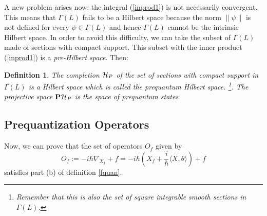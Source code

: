 \documentclass[12pt]{article}
\newtheorem{definition}{Definition}
\def\H{{\cal H}}
\begin{document}
A new problem arises now: the integral (\ref{inprod1})
is not necessarily convergent. This means that
$\Gamma (L)$ fails to be a Hilbert space
because the norm $\| \psi \|$ is not defined for every
$\psi \in \Gamma (L)$ and hence
$\Gamma (L)$ cannot be the intrinsic Hilbert space.
In order to avoid this difficulty, we can take the subset of
$\Gamma (L)$ made of sections with compact support.
This subset with the inner product
(\ref{inprod1}) is a {\it pre-Hilbert space}. Then:

\begin{definition}
The completion
$\H_P$ of the set of sections with compact support in
$\Gamma (L)$ is a Hilbert space which is called the
{\rm prequantum Hilbert space}.%
\footnote{
Remember that this is also the set of
square integrable smooth sections in $\Gamma (L)$.}.
The projective space ${\bf P}\H_P$
is the {\rm space of prequantum states}
\label{prehs}
\end{definition}



\subsection{Prequantization Operators}


Now, we can prove that the set of operators $O_f$ given by
$$
O_f := -i\hbar\nabla_{X_f} + f =
-i\hbar (X_f + \frac{i}{\hbar}\langle X, \theta \rangle ) + f
$$
satisfies part (b) of definition \ref{fquan}.
\end{document}
